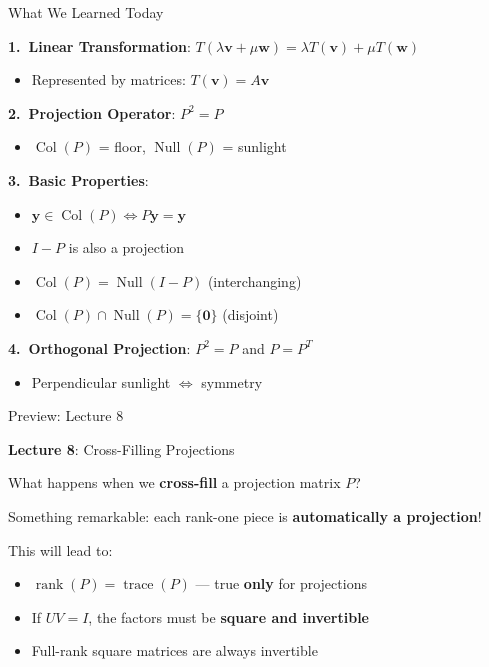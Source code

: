 \documentclass[10pt]{beamer}
\theoremstyle{definition}
\newcommand{\x}[1]{\alert{\textbf{#1}}}
\begin{document}
\begin{frame}{What We Learned Today}

\x{1.\ Linear Transformation}: $T(\lambda \mathbf{v} + \mu \mathbf{w}) = \lambda T(\mathbf{v}) + \mu T(\mathbf{w})$
\begin{itemize}
\item Represented by matrices: $T(\mathbf{v}) = A\mathbf{v}$
\end{itemize}

\vspace{0.5em}

\x{2.\ Projection Operator}: $P^2 = P$
\begin{itemize}
\item $\operatorname{Col}(P)$ = floor, \quad $\operatorname{Null}(P)$ = sunlight
\end{itemize}

\vspace{0.5em}

\x{3.\ Basic Properties}:
\begin{itemize}
\item $\mathbf{y} \in \operatorname{Col}(P) \iff P\mathbf{y} = \mathbf{y}$
\item $I - P$ is also a projection
\item $\operatorname{Col}(P) = \operatorname{Null}(I - P)$ (interchanging)
\item $\operatorname{Col}(P) \cap \operatorname{Null}(P) = \{\mathbf{0}\}$ (disjoint)
\end{itemize}

\vspace{0.5em}

\x{4.\ Orthogonal Projection}: $P^2 = P$ and $P = P^T$
\begin{itemize}
\item Perpendicular sunlight $\iff$ symmetry
\end{itemize}

\end{frame}

\begin{frame}{Preview: Lecture 8}

\x{Lecture 8}: Cross-Filling Projections

\vspace{1em}

What happens when we \x{cross-fill} a projection matrix $P$?

\vspace{0.5em}

Something remarkable: each rank-one piece is \x{automatically a projection}!

\vspace{1em}

This will lead to:

\begin{itemize}
\item $\operatorname{rank}(P) = \operatorname{trace}(P)$ --- true \x{only} for projections
\item If $UV = I$, the factors must be \x{square and invertible}
\item Full-rank square matrices are always invertible
\end{itemize}

\end{frame}
\end{document}
